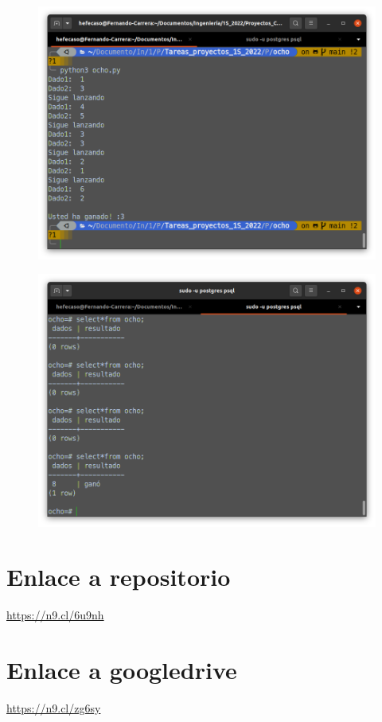 \documentclass[12pt,letterpaper]{article}
\begin{document}
\begin{multicols}{2}
\begin{figure}[H]
\centering
\includegraphics[width = \columnwidth]{4-1.png}
\end{figure}


\begin{figure}[H]
\centering
\includegraphics[width = \columnwidth]{4-2.png}
\end{figure}


\section{Enlace a repositorio}

\url{https://n9.cl/6u9nh}

\section{Enlace a googledrive}

\url{https://n9.cl/zg6sy}

\end{multicols}
\balance
\end{document}
